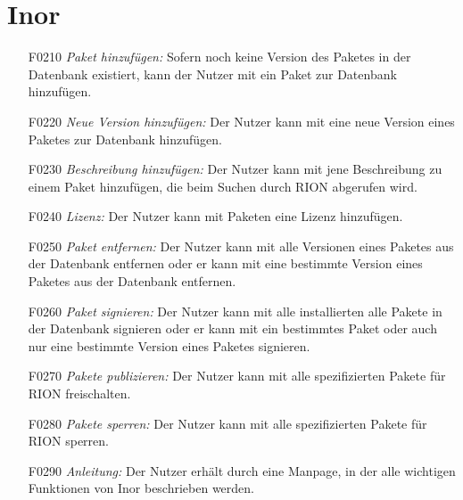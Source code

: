 \section{Inor}

\begin{itemize}
	\item[F0210] \textit{Paket hinzufügen:} Sofern noch keine Version des Paketes in der Datenbank existiert, kann der Nutzer mit  ein Paket zur Datenbank hinzufügen.
	\item[F0220] \textit{Neue Version hinzufügen:} Der Nutzer kann mit  eine neue Version eines Paketes zur Datenbank hinzufügen.
	\item[F0230] \textit{Beschreibung hinzufügen:} Der Nutzer kann mit  jene Beschreibung zu einem Paket hinzufügen, die beim Suchen durch RION abgerufen wird.
	\item[F0240] \textit{Lizenz:} Der Nutzer kann mit  Paketen eine Lizenz hinzufügen.
	\item[F0250] \textit{Paket entfernen:} Der Nutzer kann mit  alle Versionen eines Paketes aus der Datenbank entfernen oder er kann mit  eine bestimmte Version eines Paketes aus der Datenbank entfernen.
	\item[F0260] \textit{Paket signieren:} Der Nutzer kann mit  alle installierten alle Pakete in der Datenbank signieren oder er kann mit  ein bestimmtes Paket oder auch nur eine bestimmte Version eines Paketes signieren.
	\item[F0270] \textit{Pakete publizieren:} Der Nutzer kann mit  alle spezifizierten Pakete für RION freischalten.
	\item[F0280] \textit{Pakete sperren:} Der Nutzer kann mit  alle spezifizierten Pakete für RION sperren.
	\item[F0290] \textit{Anleitung:} Der Nutzer erhält durch  eine Manpage, in der alle wichtigen Funktionen von Inor beschrieben werden.


\end{itemize}
